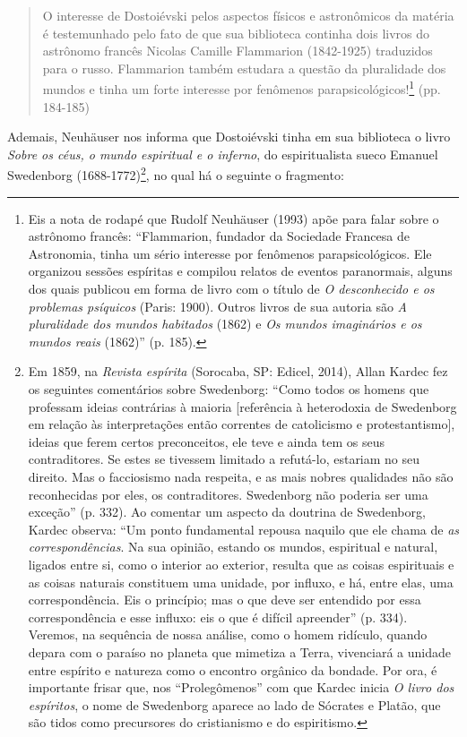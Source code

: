 \begin{quote}
O interesse de Dostoiévski pelos aspectos físicos e astronômicos da
matéria é testemunhado pelo fato de que sua biblioteca continha dois
livros do astrônomo francês Nicolas Camille Flammarion (1842-1925)
traduzidos para o russo. Flammarion também estudara a questão da
pluralidade dos mundos e tinha um forte interesse por fenômenos
parapsicológicos!\footnote{Eis a nota de rodapé que Rudolf Neuhäuser
  (1993) apõe para falar sobre o astrônomo francês: ``Flammarion,
  fundador da Sociedade Francesa de Astronomia, tinha um sério interesse
  por fenômenos parapsicológicos. Ele organizou sessões espíritas e
  compilou relatos de eventos paranormais, alguns dos quais publicou em
  forma de livro com o título de \emph{O desconhecido e os problemas
  psíquicos} (Paris: 1900). Outros livros de sua autoria são \emph{A
  pluralidade dos mundos habitados} (1862) e \emph{Os mundos imaginários
  e os mundos reais} (1862)'' (p. 185).} (pp. 184-185)
\end{quote}

Ademais, Neuhäuser nos informa que Dostoiévski tinha em sua biblioteca o
livro \emph{Sobre os céus, o mundo espiritual e o inferno}, do
espiritualista sueco Emanuel Swedenborg (1688-1772)\footnote{Em 1859, na
  \emph{Revista espírita} (Sorocaba, SP: Edicel, 2014), Allan Kardec fez
  os seguintes comentários sobre Swedenborg: ``Como todos os homens que
  professam ideias contrárias à maioria {[}referência à heterodoxia de
  Swedenborg em relação às interpretações então correntes de catolicismo
  e protestantismo{]}, ideias que ferem certos preconceitos, ele teve e
  ainda tem os seus contraditores. Se estes se tivessem limitado a
  refutá-lo, estariam no seu direito. Mas o facciosismo nada respeita, e
  as mais nobres qualidades não são reconhecidas por eles, os
  contraditores. Swedenborg não poderia ser uma exceção'' (p. 332). Ao
  comentar um aspecto da doutrina de Swedenborg, Kardec observa: ``Um
  ponto fundamental repousa naquilo que ele chama de \emph{as
  correspondências}. Na sua opinião, estando os mundos, espiritual e
  natural, ligados entre si, como o interior ao exterior, resulta que as
  coisas espirituais e as coisas naturais constituem uma unidade, por
  influxo, e há, entre elas, uma correspondência. Eis o princípio; mas o
  que deve ser entendido por essa correspondência e esse influxo: eis o
  que é difícil apreender'' (p. 334). Veremos, na sequência de nossa
  análise, como o homem ridículo, quando depara com o paraíso no planeta
  que mimetiza a Terra, vivenciará a unidade entre espírito e natureza
  como o encontro orgânico da bondade. Por ora, é importante frisar que,
  nos ``Prolegômenos'' com que Kardec inicia \emph{O livro dos
  espíritos}, o nome de Swedenborg aparece ao lado de Sócrates e Platão,
  que são tidos como precursores do cristianismo e do espiritismo.}, no
qual há o seguinte o fragmento:

